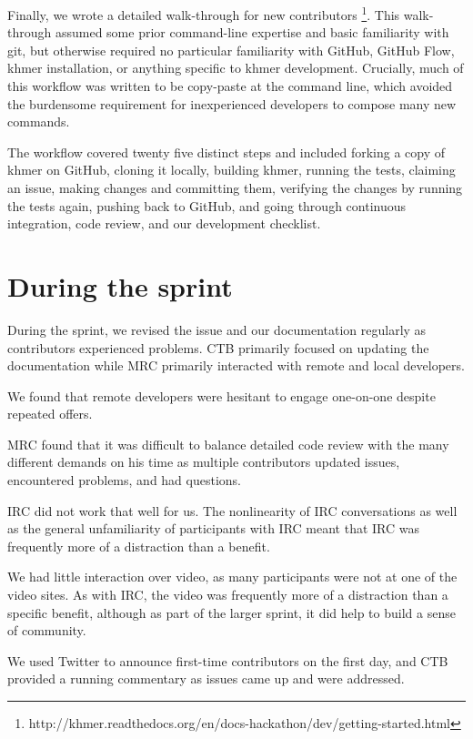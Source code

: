 \documentclass[12pt]{article}
\begin{document}
Finally, we wrote a detailed walk-through for new contributors
\footnote{http://khmer.readthedocs.org/en/docs-hackathon/dev/getting-started.html}.
This walk-through assumed some prior command-line expertise and basic
familiarity with git, but otherwise required no particular familiarity
with GitHub, GitHub Flow, khmer installation, or anything specific to
khmer development.  Crucially, much of this workflow was written to be
copy-paste at the command line, which avoided the burdensome
requirement for inexperienced developers to compose many new commands.

The workflow covered twenty five distinct steps and included forking
a copy of khmer on GitHub, cloning it locally, building khmer, running
the tests, claiming an issue, making changes and committing them,
verifying the changes by running the tests again, pushing back to
GitHub, and going through continuous integration, code review, and
our development checklist.


\section{During the sprint}

During the sprint, we revised the issue and our documentation regularly
as contributors experienced problems.  CTB primarily focused on updating
the documentation while MRC primarily interacted with remote and local
developers.

We found that remote developers were hesitant to engage one-on-one despite
repeated offers.

MRC found that it was difficult to balance detailed code review with
the many different demands on his time as multiple contributors updated
issues, encountered problems, and had questions.

IRC did not work that well for us.  The nonlinearity of IRC conversations
as well as the general unfamiliarity of participants with IRC meant that
IRC was frequently more of a distraction than a benefit.

We had little interaction over video, as many participants were not at
one of the video sites.  As with IRC, the video was frequently more of
a distraction than a specific benefit, although as part of the larger
sprint, it did help to build a sense of community.

We used Twitter to announce first-time contributors on the first day, and
CTB provided a running commentary as issues came up and were addressed.
\end{document}
